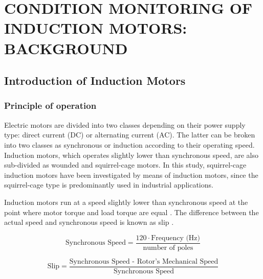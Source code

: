 \chapter{CONDITION MONITORING OF INDUCTION MOTORS: BACKGROUND }\label{Ch2}
\vspace*{-12pt} %
\section{Introduction of Induction Motors}
\subsection{Principle of operation}

Electric motors are divided into two classes depending on their power supply type: direct current (DC) or alternating current (AC). The latter can be broken into two classes as synchronous or induction according to their operating speed. Induction motors, which operates slightly lower than synchronous speed, are also sub-divided as wounded and squirrel-cage motors. In this study, squirrel-cage induction motors have been investigated by means of induction motors, since the squirrel-cage type is predominantly used in industrial applications. 

Induction motors run at a speed slightly lower than synchronous speed at the point where motor torque and load torque are equal \cite{gunnar2016}. The difference between the actual speed and synchronous speed is known as slip \cite{doe2008improving}.

\begin{equation}
	\text{Synchronous Speed} = \displaystyle \frac{120 \cdot \text{Frequency (Hz)}}{\text{number of poles}}
	\label{speed}
\end{equation}

\begin{equation}
	\text{Slip} = \displaystyle \frac{\text{Synchronous Speed - Rotor's Mechanical Speed}}{\text{Synchronous Speed}}
	\label{slip}
\end{equation}


